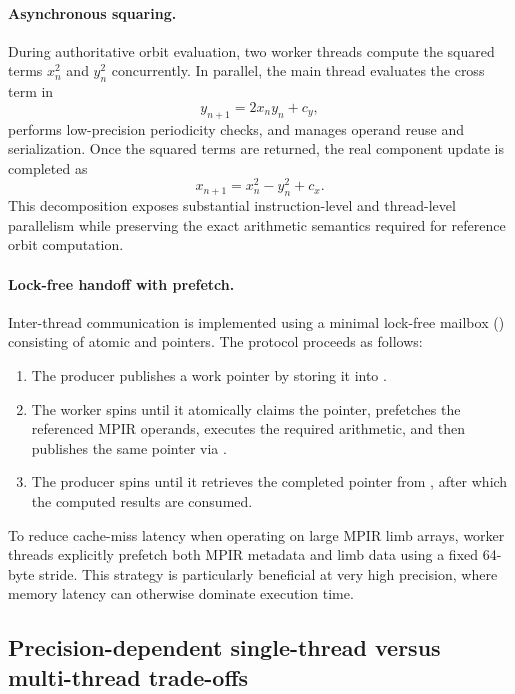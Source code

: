 \paragraph{Asynchronous squaring.}
During authoritative orbit evaluation, two worker threads compute the squared
terms \(x_n^2\) and \(y_n^2\) concurrently.  In parallel, the main thread
evaluates the cross term in
\[
  y_{n+1} = 2 x_n y_n + c_y,
\]
performs low-precision periodicity checks, and manages operand reuse and
serialization.  Once the squared terms are returned, the real component update
is completed as
\begin{equation}
  x_{n+1} = x_n^2 - y_n^2 + c_x.
\end{equation}
This decomposition exposes substantial instruction-level and thread-level
parallelism while preserving the exact arithmetic semantics required for
reference orbit computation.

\paragraph{Lock-free handoff with prefetch.}
Inter-thread communication is implemented using a minimal lock-free mailbox
() consisting of atomic  and 
pointers.  The protocol proceeds as follows:
\begin{enumerate}
  \item The producer publishes a work pointer by storing it into .
  \item The worker spins until it atomically claims the pointer, prefetches the
        referenced MPIR operands, executes the required arithmetic, and then
        publishes the same pointer via .
  \item The producer spins until it retrieves the completed pointer from
        , after which the computed results are consumed.
\end{enumerate}
To reduce cache-miss latency when operating on large MPIR limb arrays, worker
threads explicitly prefetch both MPIR metadata and limb data using a fixed
64-byte stride.  This strategy is particularly beneficial at very high
precision, where memory latency can otherwise dominate execution time.

\subsection{Precision-dependent single-thread versus multi-thread trade-offs}
\label{subsec:ref-orbit-mt-tradeoff}

